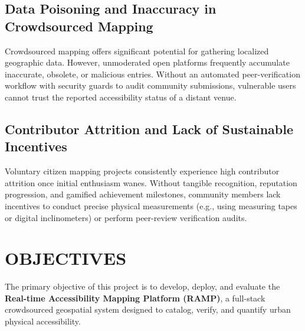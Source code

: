 \documentclass[12pt,a4paper]{report}
\begin{document}
\subsection{Data Poisoning and Inaccuracy in Crowdsourced Mapping}
Crowdsourced mapping offers significant potential for gathering localized geographic data. However, unmoderated open platforms frequently accumulate inaccurate, obsolete, or malicious entries. Without an automated peer-verification workflow with security guards to audit community submissions, vulnerable users cannot trust the reported accessibility status of a distant venue.

\subsection{Contributor Attrition and Lack of Sustainable Incentives}
Voluntary citizen mapping projects consistently experience high contributor attrition once initial enthusiasm wanes. Without tangible recognition, reputation progression, and gamified achievement milestones, community members lack incentives to conduct precise physical measurements (e.g., using measuring tapes or digital inclinometers) or perform peer-review verification audits.

\section{OBJECTIVES}
The primary objective of this project is to develop, deploy, and evaluate the \textbf{Real-time Accessibility Mapping Platform (RAMP)}, a full-stack crowdsourced geospatial system designed to catalog, verify, and quantify urban physical accessibility.
\end{document}
